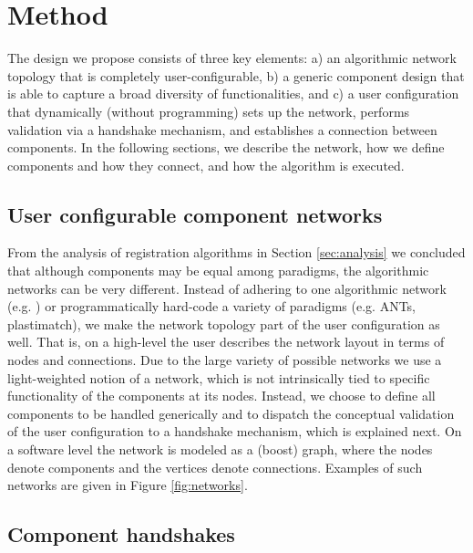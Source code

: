 \section{Method}
\label{sec:method}
The design we propose
consists of three key elements: a) an
algorithmic network topology that is completely user-configurable, b) a generic component design that is
able to capture a broad diversity of functionalities, and c) a user
configuration that dynamically (without programming) sets up the
network, performs validation via a handshake mechanism, and establishes a connection between
components. In the following sections, we describe the network, how we define components and
how they connect, and how the algorithm is executed.

\subsection{User configurable component networks}

From the analysis of registration algorithms in Section
\ref{sec:analysis} we concluded that although components may be
equal among paradigms, the algorithmic networks can be very
different. Instead of adhering to one algorithmic network (e.g.
\elastix{}) or programmatically hard-code a variety of paradigms
(e.g. ANTs, plastimatch), we make the network topology part of the
user configuration as well. That is, on a high-level the user
describes the network layout in terms of nodes and connections.
Due to the large variety of possible networks we use a light-weighted notion of a network, which is not intrinsically tied to specific functionality of the components at its nodes.
Instead, we choose to define all components to be
handled generically and to dispatch the conceptual validation of the
user configuration to a handshake mechanism, which is explained
next. On a software level the network is modeled as a (boost) graph, where the nodes denote components and the vertices denote connections. 
Examples of such networks are given in Figure \ref{fig:networks}.

\subsection{Component handshakes}

